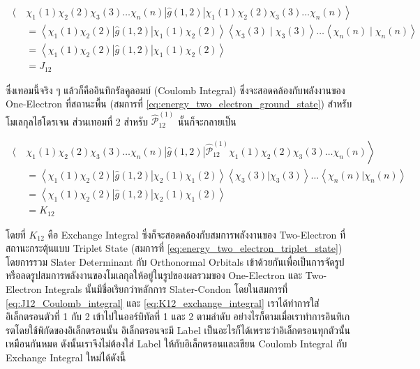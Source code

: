 \begin{equation}
    \label{eq:J12_Coulomb_integral}
    \begin{aligned}
        \left\langle \right. & \chi_1(1) \chi_2(2) \chi_3(3) \dots \chi_n(n)|\hat{g}(1,2)|
        \chi_1(1) \chi_2(2) \chi_3(3) \dots \chi_n(n) \left. \right\rangle                                                           \\
                             & = \left\langle\chi_1(1) \chi_2(2)|\hat{g}(1,2)| \chi_1(1) \chi_2(2)\right\rangle\left\langle\chi_3(3)
        \mid \chi_3(3)\right\rangle \dots\left\langle\chi_n(n) \mid \chi_n(n)\right\rangle                                           \\
                             & = \left\langle\chi_1(1) \chi_2(2)|\hat{g}(1,2)| \chi_1(1) \chi_2(2)\right\rangle                      \\
                             & = J_{12}
    \end{aligned}
\end{equation}

\noindent ซึ่งเทอมนี้จริง ๆ แล้วก็คืออินทิกรัลคูลอมบ์ (Coulomb Integral) ซึ่งจะสอดคล้องกับพลังงานของ One-Electron ที่สถานะพื้น
(สมการที่ \eqref{eq:energy_two_electron_ground_state}) สำหรับโมเลกุลไฮโดรเจน ส่วนเทอมที่ 2 สำหรับ
$\hat{\mathcal{P}}_{12}^{(1)}$ นั้นก็จะกลายเป็น

\begin{equation}
    \label{eq:K12_exchange_integral}
    \begin{aligned}
        \left\langle \right. & \chi_1(1) \chi_2(2) \chi_3(3) \dots \chi_n(n)
        |\hat{g}(1,2)|
        \hat{\mathscr{P}}_{12}^{(1)} \chi_1(1) \chi_2(2) \chi_3(3) \dots \chi_n(n) \left. \right\rangle \\
                             & = \left\langle\chi_1(1) \chi_2(2)
        |\hat{g}(1,2)|
        \chi_2(1) \chi_1(2)\right\rangle
        \left\langle\chi_3(3)|\chi_3(3)\right\rangle \dots\left\langle\chi_n(n)|\chi_n(n)\right\rangle  \\
                             & = \left\langle\chi_1(1) \chi_2(2)
        |\hat{g}(1,2)|
        \chi_2(1) \chi_1(2)\right\rangle                                                                \\
                             & = K_{12}
    \end{aligned}
\end{equation}

\noindent โดยที่ $K_{12}$ คือ Exchange Integral ซึ่งก็จะสอดคล้องกับสมการพลังงานของ Two-Electron ที่สถานะกระตุ้นแบบ Triplet
State (สมการที่ \eqref{eq:energy_two_electron_triplet_state}) โดยการรวม Slater Determinant กับ Orthonormal Orbitals
เข้าด้วยกันเพื่อเป็นการจัดรูปหรือลดรูปสมการพลังงานของโมเลกุลให้อยู่ในรูปของผลรวมของ One-Electron และ Two-Electron Integrals
นั้นมีชื่อเรียกว่าหลักการ Slater-Condon โดยในสมการที่ \eqref{eq:J12_Coulomb_integral} และ \eqref{eq:K12_exchange_integral}
เราได้ทำการใส่อิเล็กตรอนตัวที่ 1 กับ 2 เข้าไปในออร์บิทัลที่ 1 และ 2 ตามลำดับ อย่างไรก็ตามเมื่อเราทำการอินทิเกรตโดยใช้พิกัดของอิเล็กตรอนนั้น%
อิเล็กตรอนจะมี Label เป็นอะไรก็ได้เพราะว่าอิเล็กตรอนทุกตัวนั้นเหมือนกันหมด ดังนั้นเราจึงไม่ต้องใส่ Label ให้กับอิเล็กตรอนและเขียน Coulomb
Integral กับ Exchange Integral ใหม่ได้ดังนี้


